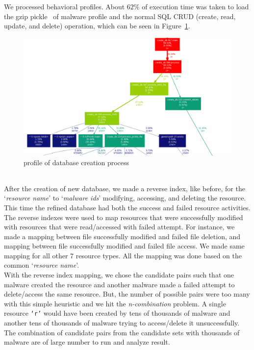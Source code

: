 We processed \gettotalmalwareii{} behavioral profiles.
About $62\%$ of execution time was taken to load the gzip pickle~\cite[]{pythonpickle} of malware profile and the normal SQL CRUD (create, read, update, and delete) operation, which can be seen in Figure~\ref{fig:dbcreation}.
\begin{figure}
\begin{center}
  \includegraphics[scale=0.4]{figures/db_create2.png}
\end{center}
\caption{profile of database creation process}
\label{fig:dbcreation}
\end{figure}
\\
After the creation of new database, we made a reverse index, like before, for the `\emph{resource name}' to `\emph{malware ids}' modifying, accessing, and deleting the resource.
This time the refined database had both the success and failed resource activities.
The reverse indexes were used to map resources that were successfully modified with resources that were read/accessed with failed attempt.
For instance, we made a mapping between file successfully modified and failed file deletion, and mapping between file successfully modified and failed file access.
We made same mapping for all other 7 resource types.
All the mapping was done based on the common `\emph{resource name}'.\\

With the reverse index mapping, we chose the candidate pairs such that one malware created the resource and another malware made a failed attempt to delete/access the same resource.
But, the number of possible pairs were too many with this simple heuristic and we hit the \emph{n-combination} problem.
A single resource \texttt{`r'} would have been created by tens of thousands of malware and another tens of thousands of malware trying to access/delete it unsuccessfully.
The combination of candidate pairs from the candidate sets with thousands of malware are of large number to run and analyze result.\\

